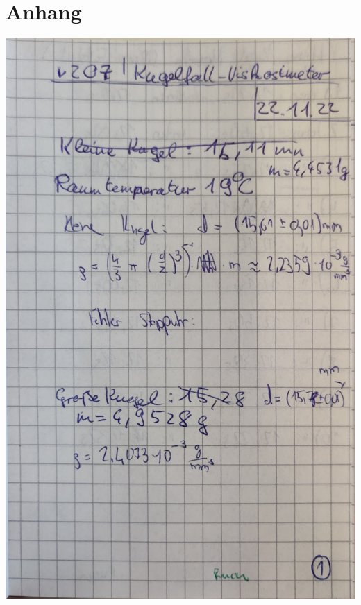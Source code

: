 \section*{Anhang}
\begin{minipage}[t]{0.45\textwidth}
    \includegraphics[width=\textwidth, page=1]{V207 Daten.pdf}
\end{minipage}
